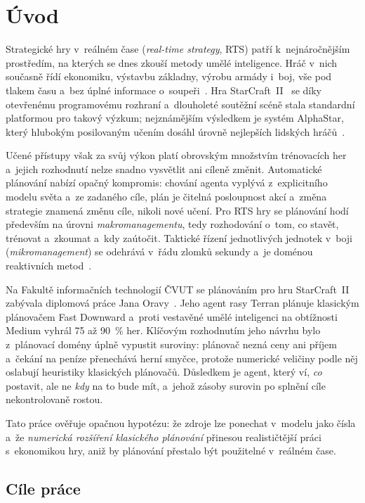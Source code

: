 \chapter*{Úvod}

Strategické hry v~reálném čase (\emph{real-time strategy}, RTS) patří k~nejnáročnějším prostředím, na kterých se dnes zkouší metody umělé inteligence. Hráč v~nich současně řídí ekonomiku, výstavbu základny, výrobu armády i~boj, vše pod tlakem času a~bez úplné informace o~soupeři~\cite{Ontanon2013}. Hra StarCraft~II~\cite{Starcraft2} se díky otevřenému programovému rozhraní a~dlouholeté soutěžní scéně stala standardní platformou pro takový výzkum; nejznámějším výsledkem je systém AlphaStar, který hlubokým posilovaným učením dosáhl úrovně nejlepších lidských hráčů~\cite{VinyalsEtAl2019}.

Učené přístupy však za svůj výkon platí obrovským množstvím trénovacích her a~jejich rozhodnutí nelze snadno vysvětlit ani cíleně změnit. Automatické plánování nabízí opačný kompromis: chování agenta vyplývá z~explicitního modelu světa a~ze zadaného cíle, plán je čitelná posloupnost akcí a~změna strategie znamená změnu cíle, nikoli nové učení. Pro RTS hry se plánování hodí především na úrovni \emph{makromanagementu}, tedy rozhodování o~tom, co stavět, trénovat a~zkoumat a~kdy zaútočit. Taktické řízení jednotlivých jednotek v~boji (\emph{mikromanagement}) se odehrává v~řádu zlomků sekundy a~je doménou reaktivních metod~\cite{ChurchillBuro2011,Duarte2020}.

Na Fakultě informačních technologií ČVUT se plánováním pro hru StarCraft~II zabývala diplomová práce Jana Oravy~\cite{Orava2025}. Jeho agent rasy Terran plánuje klasickým plánovačem Fast Downward a~proti vestavěné umělé inteligenci na obtížnosti Medium vyhrál 75 až 90~\% her. Klíčovým rozhodnutím jeho návrhu bylo z~plánovací domény úplně vypustit suroviny: plánovač nezná ceny ani příjem a~čekání na peníze přenechává herní smyčce, protože numerické veličiny podle něj oslabují heuristiky klasických plánovačů. Důsledkem je agent, který ví, \emph{co} postavit, ale ne \emph{kdy} na to bude mít, a~jehož zásoby surovin po splnění cíle nekontrolovaně rostou.

Tato práce ověřuje opačnou hypotézu: že zdroje lze ponechat v~modelu jako čísla a~že \emph{numerická rozšíření klasického plánování} přinesou realističtější práci s~ekonomikou hry, aniž by plánování přestalo být použitelné v~reálném čase.

\section*{Cíle práce}

